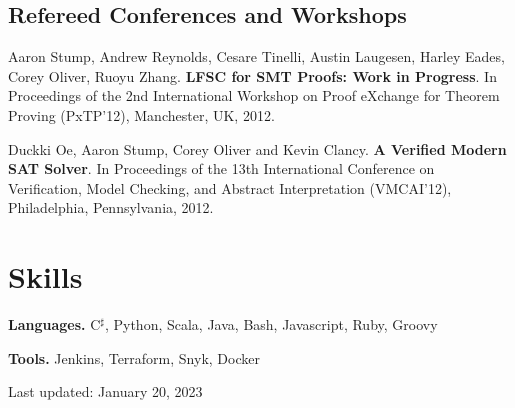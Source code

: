 \documentclass[10pt,letterpaper]{article}
\renewenvironment{itemize}{
  \begin{list}{}{
      \setlength{\leftmargin}{1.5em}
      \setlength{\itemsep}{0.25em}
      \setlength{\parskip}{0pt}
      \setlength{\parsep}{0.25em}
    }
  }{
  \end{list}
}
\begin{document}
\subsection*{Refereed Conferences and Workshops}

\begin{itemize}
  {\item Aaron Stump, Andrew Reynolds, Cesare Tinelli, Austin Laugesen, Harley
    Eades, Corey Oliver, Ruoyu Zhang. \textbf{LFSC for SMT Proofs: Work in
    Progress}. In Proceedings of the 2nd International Workshop on Proof
    eXchange for Theorem Proving (PxTP'12), Manchester, UK, 2012.}
\end{itemize}

\begin{itemize}
  {\item Duckki Oe, Aaron Stump, Corey Oliver and Kevin Clancy. \textbf{A
    Verified Modern SAT Solver}. In Proceedings of the 13th International
    Conference on Verification, Model Checking, and Abstract Interpretation
    (VMCAI'12), Philadelphia, Pennsylvania, 2012.}
\end{itemize}


\section*{Skills}
\begin{itemize}
\item \textbf{Languages.} C$^\sharp$, Python, Scala, Java, Bash,
  Javascript, Ruby, Groovy
\item \textbf{Tools.} Jenkins, Terraform, Snyk, Docker
\item
\end{itemize}
\medskip

\begin{center}
  \begin{small}
    Last updated: January 20, 2023 %
  \end{small}
\end{center}
\end{document}

